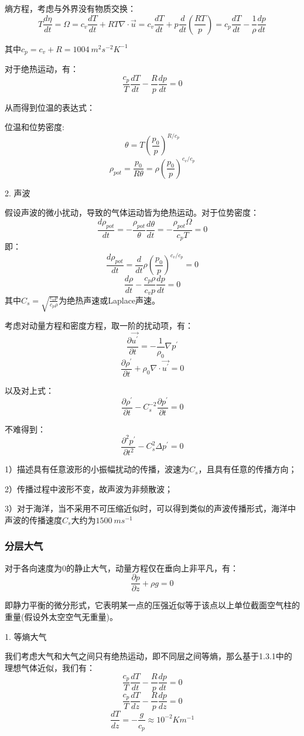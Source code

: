 \documentclass{article}
\begin{document}
熵方程，考虑与外界没有物质交换：
$$T\frac{d\eta}{dt}=\Omega=c_v\frac{dT}{dt}+RT\nabla\cdot\vec{u}=c_v\frac{dT}{dt}+p\frac{d}{dt}\left(\frac{RT}{p}\right)=c_p\frac{dT}{dt}-\frac{1}{\rho}\frac{dp}{dt}$$

其中$c_p = c_v+R=1004 \ m^2s^{-2}K^{-1}$

对于绝热运动，有：
$$\frac{c_p}{T}\frac{dT}{dt}-\frac{R}{p}\frac{dp}{dt}=0$$

从而得到位温的表达式：

位温和位势密度:
$$\theta=T\left(\frac{p_0}{p}\right)^{R/c_p}$$
$$\rho_{pot} =\frac{p_0}{R\theta}=\rho\left(\frac{p_0}{p}\right)^{c_v/c_p}$$

2. 声波

假设声波的微小扰动，导致的气体运动皆为绝热运动。对于位势密度：
$$\frac{d\rho_{pot}}{dt}=-\frac{\rho_{pot}}{\theta}\frac{d\theta}{dt}=-\frac{\rho_{pot}\Omega}{c_pT}=0$$
即：
$$\frac{d\rho_{pot}}{dt}=\frac{d}{dt}\rho\left(\frac{p_0}{p}\right)^{c_v/c_p}=0$$
$$\frac{d\rho}{dt}-\frac{c_p\rho}{c_vp}\frac{dp}{dt}=0$$
其中$C_s=\sqrt{\frac{c_vp}{c_p\rho}}$为绝热声速或Laplace声速。

考虑对动量方程和密度方程，取一阶的扰动项，有：
$$\frac{\partial \vec{u^{\prime}}}{\partial t}=-\frac{1}{\rho_0}\nabla p^{\prime}$$
$$\frac{\partial\rho^{\prime}}{\partial t}+\rho_0\nabla\cdot\vec{u^{\prime}}=0$$

以及对上式：
$$\frac{\partial\rho^{\prime}}{\partial t}-C_s^{-2}\frac{\partial p^{\prime}}{\partial t}=0$$

不难得到：
$$\frac{\partial^2 p^{\prime}}{\partial t^2}-C_s^2\Delta p^{\prime}=0$$

1）描述具有任意波形的小振幅扰动的传播，波速为$C_s$，且具有任意的传播方向；

2）传播过程中波形不变，故声波为非频散波；

3）对于海洋，当不采用不可压缩近似时，可以得到类似的声波传播形式，海洋中声波的传播速度$C_s$大约为$1500 \ ms^{-1}$


\subsubsection{分层大气}

对于各向速度为$0$的静止大气，动量方程仅在垂向上非平凡，有：
$$\frac{\partial p}{\partial z}+\rho g = 0$$

即静力平衡的微分形式，它表明某一点的压强近似等于该点以上单位截面空气柱的重量(假设外太空空气无重量)。

1. 等熵大气

我们考虑大气和大气之间只有绝热运动，即不同层之间等熵，那么基于1.3.1中的理想气体近似，我们有：
$$\frac{c_p}{T}\frac{dT}{dt}-\frac{R}{p}\frac{dp}{dt}=0$$
$$\frac{c_p}{T}\frac{dT}{dz}-\frac{R}{p}\frac{dp}{dz}=0$$
$$\frac{dT}{dz}=-\frac{g}{c_p}\approx10^{-2}Km^{-1}$$
\end{document}
